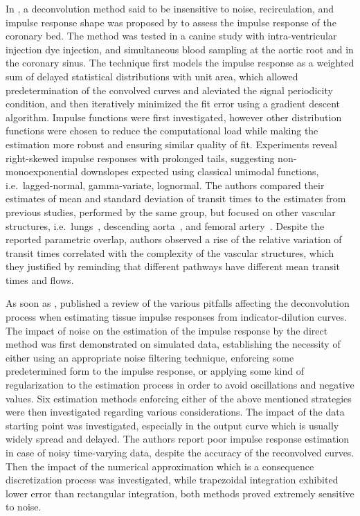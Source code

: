 In \citeyear{Knopp:1976uc}, a deconvolution method said to be insensitive to noise, recirculation, and impulse response shape was proposed by \citet{Knopp:1976uc} to assess the impulse response of the coronary bed.
The method was tested in a canine study with intra-ventricular injection dye injection, and simultaneous blood sampling at the aortic root and in the coronary sinus.
The technique first models the impulse response as a weighted sum of delayed statistical distributions with unit area, which allowed predetermination of the convolved curves and aleviated the signal periodicity condition, and then iteratively minimized the fit error using a gradient descent algorithm.
Impulse functions were first investigated, however other distribution functions were chosen to reduce the computational load while making the estimation more robust and ensuring similar quality of fit.
Experiments reveal right-skewed impulse responses with prolonged tails, suggesting non-monoexponential downslopes expected using classical unimodal functions, i.e.~lagged-normal, gamma-variate, lognormal.
The authors compared their estimates of mean and standard deviation of transit times to the estimates from previous studies, performed by the same group, but focused on other vascular structures, i.e.~lungs~\cite{Knopp:1969tu}, descending aorta~\cite{Bassingthwaighte:1967vy}, and femoral artery~\cite{Bassingthwaighte:1966jn}. 
Despite the reported parametric overlap, authors observed a rise of the relative variation of transit times correlated with the complexity of the vascular structures, which they justified by reminding that different pathways have different mean transit times and flows.

As soon as \citeyear{Gamel:1973uz}, \citet{Gamel:1973uz} published a review of the various pitfalls affecting the deconvolution process when estimating tissue impulse responses from indicator-dilution curves. 
The impact of noise on the estimation of the impulse response by the direct method was first demonstrated on simulated data, establishing the necessity of either using an appropriate noise filtering technique, enforcing some predetermined form to the impulse response, or applying some kind of regularization to the estimation process in order to avoid oscillations and negative values.
Six estimation methods enforcing either of the above mentioned strategies were then investigated regarding various considerations.
The impact of the data starting point was investigated, especially in the output curve which is usually widely spread and delayed.
The authors report poor impulse response estimation in case of noisy time-varying data, despite the accuracy of the reconvolved curves.
Then the impact of the numerical approximation which is a consequence discretization process was investigated, while trapezoidal integration exhibited lower error than rectangular integration, both methods proved extremely sensitive to noise. 

